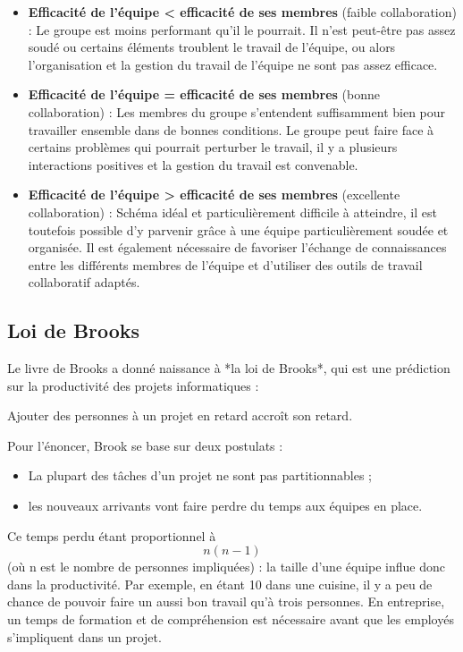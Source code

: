 \begin{itemize}

\item \textbf{Efficacité de l'équipe \textless \: efficacité de ses membres} (faible collaboration) :
Le groupe est moins performant qu'il le pourrait. Il n'est peut-être pas assez soudé ou certains éléments troublent le travail de l'équipe, ou alors l'organisation et la gestion du travail de l'équipe ne sont pas assez efficace.

\item \textbf{Efficacité de l'équipe = efficacité de ses membres} (bonne collaboration) :
Les membres du groupe s'entendent suffisamment bien pour travailler ensemble dans de bonnes conditions. Le groupe peut faire face à certains problèmes qui pourrait perturber le travail, il y a plusieurs interactions positives et la gestion du travail est convenable.

\item \textbf{Efficacité de l'équipe \textgreater \: efficacité de ses membres} (excellente collaboration) :
Schéma idéal et particulièrement difficile à atteindre, il est toutefois possible d'y parvenir grâce à une équipe particulièrement soudée et organisée. Il est également nécessaire de favoriser l'échange de connaissances entre les différents membres de l'équipe et d'utiliser des outils de travail collaboratif adaptés.

\end{itemize}

\subsection{Loi de Brooks}
Le livre de Brooks a donné naissance à *la loi de Brooks*, qui est une prédiction sur la productivité des projets informatiques :

\begin{Quote}
Ajouter des personnes à un projet en retard accroît son retard.
\end{Quote}

Pour l'énoncer, Brook se base sur deux postulats :
\begin{itemize}
\item La plupart des tâches d'un projet ne sont pas partitionnables ;
\item les nouveaux arrivants vont faire perdre du temps aux équipes en place.
\end{itemize}

Ce temps perdu étant proportionnel à \[n(n-1)\] (où n est le nombre de personnes impliquées) : la taille d'une équipe influe donc dans la productivité. Par exemple, en étant 10 dans une cuisine, il y a peu de chance de pouvoir faire un aussi bon travail qu'à trois personnes. En entreprise, un temps de formation et de compréhension est nécessaire avant que les employés s'impliquent dans un projet.

